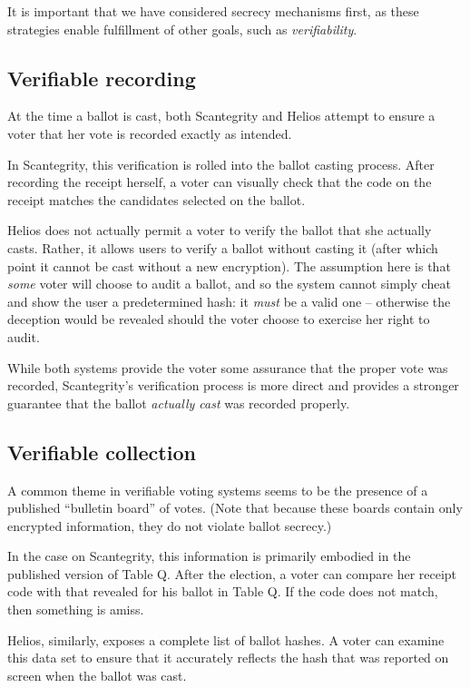 \documentclass[10pt,twocolumn]{article}
\begin{document}
It is important that we have considered secrecy mechanisms first, as these strategies enable
fulfillment of other goals, such as \emph{verifiability}.

\subsection{Verifiable recording}

At the time a ballot is cast, both Scantegrity and Helios attempt to ensure a voter that her
vote is recorded exactly as intended.

In Scantegrity, this verification is rolled into the ballot casting process. After recording the
receipt herself, a voter can visually check that the code on the receipt matches the candidates
selected on the ballot.

Helios does not actually permit a voter to verify the ballot that she actually casts. Rather, it
allows users to verify a ballot without casting it (after which point it cannot be cast without
a new encryption). The assumption here is that \emph{some} voter will choose to audit a ballot, and
so the system cannot simply cheat and show the user a predetermined hash: it \emph{must} be a valid
one -- otherwise the deception would be revealed should the voter choose to exercise her right
to audit.

While both systems provide the voter some assurance that the proper vote was recorded, Scantegrity's
verification process is more direct and provides a stronger guarantee that the ballot \emph{actually
cast} was recorded properly.

\subsection{Verifiable collection}

A common theme in verifiable voting systems seems to be the presence of a published ``bulletin
board'' of votes. (Note that because these boards contain only encrypted information, they do not
violate ballot secrecy.)

In the case on Scantegrity, this information is primarily embodied in the published version of Table
Q. After the election, a voter can compare her receipt code with that revealed for his ballot in
Table Q. If the code does not match, then something is amiss.

Helios, similarly, exposes a complete list of ballot hashes. A voter can examine this data set to
ensure that it accurately reflects the hash that was reported on screen when the ballot was cast.
\end{document}
